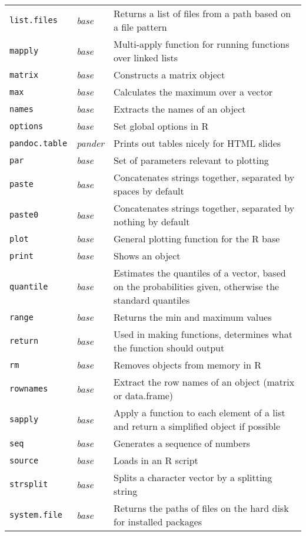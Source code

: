 \documentclass[10pt]{article}
\newcommand{\code}[1]{\texttt{#1}}
\newcommand{\pkg}[1]{\emph{#1}}
\begin{document}
\begin{longtable}{p{1.5in}p{1in}p{5in}}
\code{list.files} & \pkg{base} & Returns a list of files from a path based on a file pattern \\
\code{mapply} & \pkg{base} & Multi-apply function for running functions over linked lists \\
\code{matrix} & \pkg{base} & Constructs a matrix object \\
\code{max} & \pkg{base} & Calculates the maximum over a vector \\
\code{names} & \pkg{base} & Extracts the names of an object \\
\code{options} & \pkg{base} & Set global options in R\\
\code{pandoc.table} & \pkg{pander} & Prints out tables nicely for HTML slides \\
\code{par} & \pkg{base} & Set of parameters relevant to plotting \\
\code{paste} & \pkg{base} & Concatenates strings together, separated by spaces by default \\
\code{paste0} & \pkg{base} & Concatenates strings together, separated by nothing by default  \\
\code{plot} & \pkg{base} & General plotting function for the R base \\
\code{print} & \pkg{base} & Shows an object \\
\code{quantile} & \pkg{base} & Estimates the quantiles of a vector, based on the probabilities given, otherwise the standard quantiles \\
\code{range} & \pkg{base} & Returns the min and maximum values \\
\code{return} & \pkg{base} & Used in making functions, determines what the function should output \\
\code{rm} & \pkg{base} & Removes objects from memory in R\\
\code{rownames} & \pkg{base} & Extract the row names of an object (matrix or data.frame) \\
\code{sapply} & \pkg{base} & Apply a function to each element of a list and return a simplified object if possible \\
\code{seq} & \pkg{base} & Generates a sequence of numbers \\
\code{source} & \pkg{base} & Loads in an R script \\
\code{strsplit} & \pkg{base} & Splits a character vector by a splitting string \\
\code{system.file} & \pkg{base} & Returns the paths of files on the hard disk for installed packages\\

\end{longtable}
\end{document}
